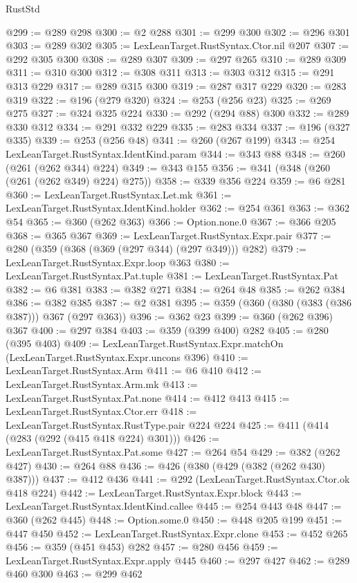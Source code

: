 \begin{lexlean}{RustStd}
\begin{coremodule}
@299 := @289 @298
@300 := @2 @288
@301 := @299 @300
@302 := @296 @301
@303 := @289 @302
@305 := LexLeanTarget.RustSyntax.Ctor.nil @207
@307 := @292 @305 @300
@308 := @289 @307
@309 := @297 @265
@310 := @289 @309
@311 := @310 @300
@312 := @308 @311
@313 := @303 @312
@315 := @291 @313 @229
@317 := @289 @315 @300
@319 := @287 @317 @229
@320 := @283 @319
@322 := @196 (@279 @320)
@324 := @253 (@256 @23)
@325 := @269 @275
@327 := @324 @325 @224
@330 := @292 (@294 @88) @300
@332 := @289 @330 @312
@334 := @291 @332 @229
@335 := @283 @334
@337 := @196 (@327 @335)
@339 := @253 (@256 @48)
@341 := @260 (@267 @199)
@343 := @254 LexLeanTarget.RustSyntax.IdentKind.param
@344 := @343 @88
@348 := @260 (@261 (@262 @344) @224)
@349 := @343 @155
@356 := @341 (@348 (@260 (@261 (@262 @349) @224) @275))
@358 := @339 @356 @224
@359 := @6 @281
@360 := LexLeanTarget.RustSyntax.Let.mk
@361 := LexLeanTarget.RustSyntax.IdentKind.holder
@362 := @254 @361
@363 := @362 @54
@365 := @360 (@262 @363)
@366 := Option.none.{0}
@367 := @366 @205
@368 := @365 @367
@369 := LexLeanTarget.RustSyntax.Expr.pair
@377 := @280 (@359 (@368 (@369 (@297 @344) (@297 @349))) @282)
@379 := LexLeanTarget.RustSyntax.Expr.loop @363
@380 := LexLeanTarget.RustSyntax.Pat.tuple
@381 := LexLeanTarget.RustSyntax.Pat
@382 := @6 @381
@383 := @382 @271
@384 := @264 @48
@385 := @262 @384
@386 := @382 @385
@387 := @2 @381
@395 := @359 (@360 (@380 (@383 (@386 @387))) @367 (@297 @363))
@396 := @362 @23
@399 := @360 (@262 @396) @367
@400 := @297 @384
@403 := @359 (@399 @400) @282
@405 := @280 (@395 @403)
@409 := LexLeanTarget.RustSyntax.Expr.matchOn (LexLeanTarget.RustSyntax.Expr.uncons @396)
@410 := LexLeanTarget.RustSyntax.Arm
@411 := @6 @410
@412 := LexLeanTarget.RustSyntax.Arm.mk
@413 := LexLeanTarget.RustSyntax.Pat.none
@414 := @412 @413
@415 := LexLeanTarget.RustSyntax.Ctor.err
@418 := LexLeanTarget.RustSyntax.RustType.pair @224 @224
@425 := @411 (@414 (@283 (@292 (@415 @418 @224) @301)))
@426 := LexLeanTarget.RustSyntax.Pat.some
@427 := @264 @54
@429 := @382 (@262 @427)
@430 := @264 @88
@436 := @426 (@380 (@429 (@382 (@262 @430) @387)))
@437 := @412 @436
@441 := @292 (LexLeanTarget.RustSyntax.Ctor.ok @418 @224)
@442 := LexLeanTarget.RustSyntax.Expr.block
@443 := LexLeanTarget.RustSyntax.IdentKind.callee
@445 := @254 @443 @48
@447 := @360 (@262 @445)
@448 := Option.some.{0}
@450 := @448 @205 @199
@451 := @447 @450
@452 := LexLeanTarget.RustSyntax.Expr.clone
@453 := @452 @265
@456 := @359 (@451 @453) @282
@457 := @280 @456
@459 := LexLeanTarget.RustSyntax.Expr.apply @445
@460 := @297 @427
@462 := @289 @460 @300
@463 := @299 @462

\end{coremodule}
\end{lexlean}
